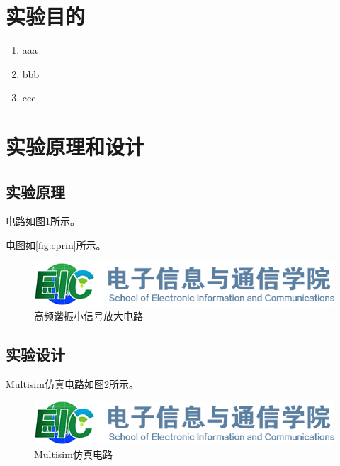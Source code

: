 \documentclass[12pt]{article}
\begin{document}

\newpage

\begin{center}
    \begin{spacing}{1.5}
    \tableofcontents
    \end{spacing}
\end{center}
\newpage

\pagestyle{fancy}

\section{实验目的}

\begin{enumerate}
    \item aaa
    \item bbb
    \item ccc
\end{enumerate}


\section{实验原理和设计}

\subsection{实验原理}

电路如图\ref{fig:cprin}所示。

电图如\autoref{fig:cprin}所示。

\begin{figure}[htbp]
    \centering
    \includegraphics[scale=0.3]{figures/logo-hust-eic.png}
    \caption{高频谐振小信号放大电路}
    \label{fig:cprin}
\end{figure}

\subsection{实验设计}

Multisim仿真电路如图\ref{fig:csim}所示。

\begin{figure}[htbp]
    \centering
    \includegraphics[scale=0.3]{figures/logo-hust-eic.png}
    \caption{Multisim仿真电路}
    \label{fig:csim}
\end{figure}
\end{document}
